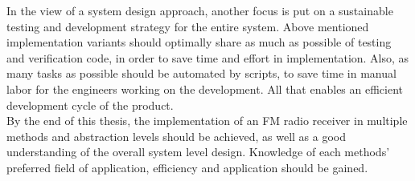 In the view of a system design approach, another focus is put on a sustainable testing and development strategy for the entire system.
Above mentioned implementation variants should optimally share as much as possible of testing and verification code, in order to save time and effort in implementation.
Also, as many tasks as possible should be automated by scripts, to save time in manual labor for the engineers working on the development.
All that enables an efficient development cycle of the product.\\

By the end of this thesis, the implementation of an FM radio receiver in multiple methods and abstraction levels should be achieved, as well as a good understanding of the overall system level design.
Knowledge of each methods' preferred field of application, efficiency and application should be gained.


%
%
%

%
%
%
%
%
%
%
%
